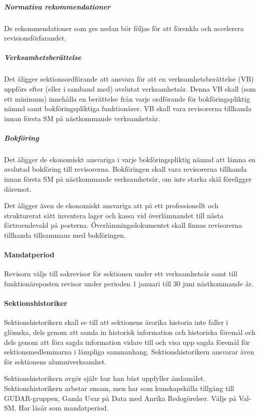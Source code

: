 \documentclass[a4paper,12pt]{article}
\begin{document}
\subparagraph{Normativa rekommendationer}

De rekommendationer som ges nedan bör följas för att förenkla och accelerera revisionsförfarandet.

\subparagraph{Verksamhetsberättelse}

Det åligger sektionsordförande att ansvara för att en verksamhetsberättelse (VB) uppförs efter (eller i samband med) avslutat verksamhetsår. Denna VB skall (som ett minimum) innehålla en berättelse från varje ordförande för bokföringspliktig nämnd samt bokföringspliktiga funktionärer. VB skall vara revisorerna tillhanda innan första SM på nästkommande verksamhetsår.

\subparagraph{Bokföring}

Det åligger de ekonomiskt ansvariga i varje bokföringspliktig nämnd att lämna en avslutad bokföring till revisorerna. Bokföringen skall vara revisorerna tillhanda innan första SM på nästkommande verksamhetsår, om inte starka skäl föreligger däremot.

Det åligger även de ekonomiskt ansvariga att på ett professionellt och strukturerat sätt inventera lager och kassa vid överlämnandet till nästa förtroendevald på posterna. Överlämningsdokumentet skall finnas revisorerna tillhanda tillsammans med bokföringen.

\paragraph{Mandatperiod}

Revisorn väljs till sakrevisor för sektionen under ett verksamhetsår samt till funktionärsposten revisor under perioden 1 januari till 30 juni nästkommande år.

\paragraph{Sektionshistoriker}

Sektionshistorikern skall se till att sektionens ärorika historia inte faller i
glömska, dels genom att samla in historisk information och historiska föremål och dels genom att föra sagda information vidare till och visa upp sagda föremål för sektionsmedlemmarna i lämpliga sammanhang. Sektionshistorikern ansvarar även för sektionens alumniverksamhet.

Sektionshistorikern avgör själv hur han bäst uppfyller ändamålet. Sektionshistorikern arbetar ensam, men har som kunskapskälla tillgång till GUDAR-gruppen, Gamla Uvar på Data med Anrika Redogörelser. Väljs på Val-SM. Har läsår som mandatperiod.
\end{document}
